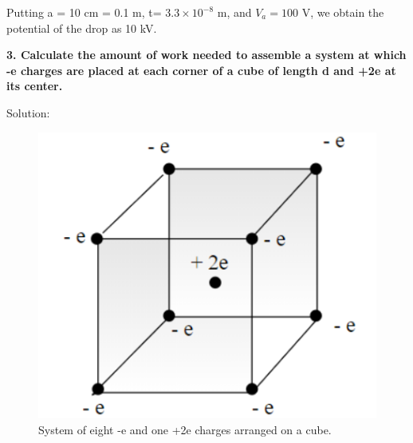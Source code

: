 Putting a = 10 cm = 0.1 m, t= $3.3 \times 10^{-8}$ m, and $V_a = 100$ V, we obtain the potential of the drop as 10 kV.\\
\pagebreak

\begin{tcolorbox}
\textbf{3. Calculate the amount of work needed to assemble a system at which -e charges are placed at each corner of a cube of length d and +2e at its center. }
\end{tcolorbox}
Solution:\\

\begin{figure}[h]
    \centering
    \includegraphics[scale = 0.59]{figures/elecmag/fig4.png}
    \caption{System of eight -e and one +2e charges arranged on a cube.}
    \label{fig4}
\end{figure}


